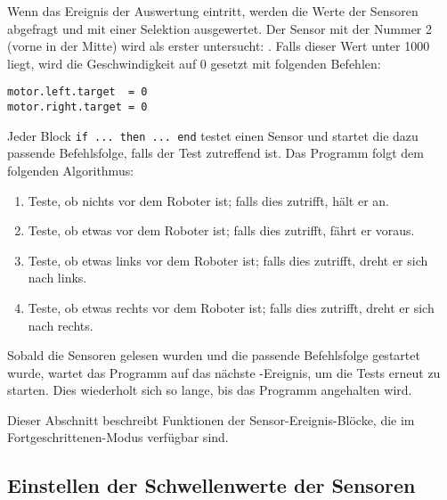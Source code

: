 Wenn das Ereignis der Auswertung eintritt, werden die Werte der Sensoren abgefragt und mit einer Selektion ausgewertet. Der Sensor mit der Nummer 2 (vorne in der Mitte) wird als erster untersucht: . Falls dieser Wert unter 1000 liegt, wird die Geschwindigkeit auf 0 gesetzt mit folgenden Befehlen: 

\begin{footnotesize}
\begin{verbatim}
motor.left.target  = 0
motor.right.target = 0
\end{verbatim}
\end{footnotesize}

Jeder Block \verb+if ... then ... end+ testet einen Sensor und startet die dazu passende Befehlsfolge, falls der Test zutreffend ist. Das Programm folgt dem folgenden Algorithmus: 

\begin{enumerate}[start=0,noitemsep,nosep]
\item Teste, ob nichts vor dem Roboter ist; falls dies zutrifft, hält er an.
\item Teste, ob etwas vor dem Roboter ist; falls dies zutrifft, fährt er voraus.
\item Teste, ob etwas links vor dem Roboter ist; falls dies zutrifft, dreht er sich nach links.
\item Teste, ob etwas rechts vor dem Roboter ist; falls dies zutrifft, dreht er sich nach rechts.
\end{enumerate}

Sobald die Sensoren gelesen wurden und die passende Befehlsfolge gestartet wurde, wartet das Programm auf das nächste -Ereignis, um die Tests erneut zu starten.  Dies wiederholt sich so lange, bis das Programm angehalten wird. 





Dieser Abschnitt beschreibt Funktionen der Sensor-Ereignis-Blöcke, die im Fortgeschrittenen-Modus verfügbar sind. 

\subsection*{Einstellen der Schwellenwerte der Sensoren}

